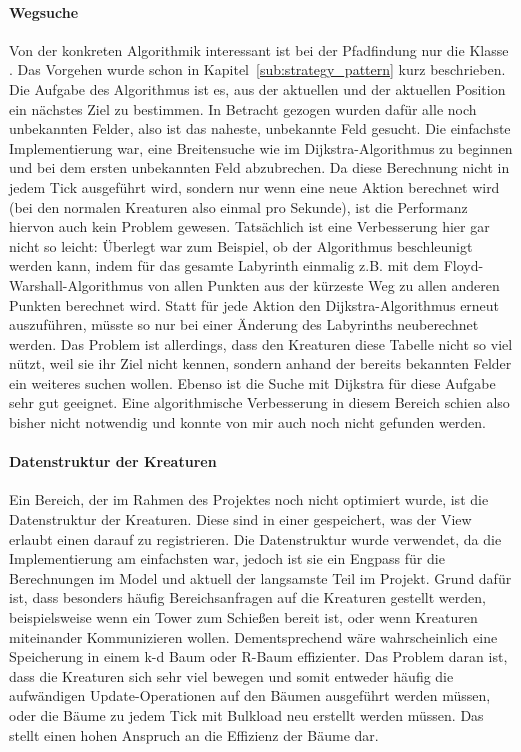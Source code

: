 \paragraph{Wegsuche} Von der konkreten Algorithmik interessant ist bei der Pfadfindung nur die Klasse . Das Vorgehen wurde schon in Kapitel~\ref{sub:strategy_pattern} kurz beschrieben. Die Aufgabe des Algorithmus ist es, aus der aktuellen  und der aktuellen Position ein nächstes Ziel zu bestimmen. In Betracht gezogen wurden dafür alle noch unbekannten Felder, also ist das naheste, unbekannte Feld gesucht. Die einfachste Implementierung war, eine Breitensuche wie im Dijkstra-Algorithmus zu beginnen und bei dem ersten unbekannten Feld abzubrechen. Da diese Berechnung nicht in jedem Tick ausgeführt wird, sondern nur wenn eine neue Aktion berechnet wird (bei den normalen Kreaturen also einmal pro Sekunde), ist die Performanz hiervon auch kein Problem gewesen. Tatsächlich ist eine Verbesserung hier gar nicht so leicht: Überlegt war zum Beispiel, ob der Algorithmus beschleunigt werden kann, indem für das gesamte Labyrinth einmalig z.B. mit dem Floyd-Warshall-Algorithmus von allen Punkten aus der kürzeste Weg zu allen anderen Punkten berechnet wird. Statt für jede Aktion den Dijkstra-Algorithmus erneut auszuführen, müsste so nur bei einer Änderung des Labyrinths neuberechnet werden. Das Problem ist allerdings, dass den Kreaturen diese Tabelle nicht so viel nützt, weil sie ihr Ziel nicht kennen, sondern anhand der bereits bekannten Felder ein weiteres suchen wollen. Ebenso ist die Suche mit Dijkstra für diese Aufgabe sehr gut geeignet. Eine algorithmische Verbesserung in diesem Bereich schien also bisher nicht notwendig und konnte von mir auch noch nicht gefunden werden.

\paragraph{Datenstruktur der Kreaturen} Ein Bereich, der im Rahmen des Projektes noch nicht optimiert wurde, ist die Datenstruktur der Kreaturen. Diese sind in einer  gespeichert, was der View erlaubt einen  darauf zu registrieren. Die Datenstruktur wurde verwendet, da die Implementierung am einfachsten war, jedoch ist sie ein Engpass für die Berechnungen im Model und aktuell der langsamste Teil im Projekt. Grund dafür ist, dass besonders häufig Bereichsanfragen auf die Kreaturen gestellt werden, beispielsweise wenn ein Tower zum Schießen bereit ist, oder wenn Kreaturen miteinander Kommunizieren wollen. Dementsprechend wäre wahrscheinlich eine Speicherung in einem k-d Baum oder R-Baum effizienter. Das Problem daran ist, dass die Kreaturen sich sehr viel bewegen und somit entweder häufig die aufwändigen Update-Operationen auf den Bäumen ausgeführt werden müssen, oder die Bäume zu jedem Tick mit Bulkload neu erstellt werden müssen. Das stellt einen hohen Anspruch an die Effizienz der Bäume dar.

